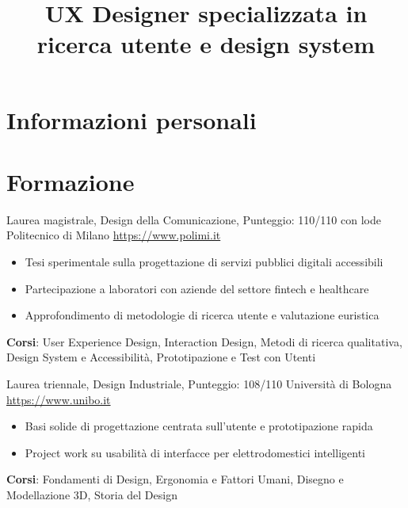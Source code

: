 \documentclass[a4paper, serif, 10pt]{moderncv}
\title{UX Designer specializzata in ricerca utente e design system}
\begin{document}
\maketitle

\section{Informazioni personali}

\section{Formazione}

        {Laurea magistrale, Design della Comunicazione, Punteggio: 110/110 con lode}
        {Politecnico di Milano}
        {\url{https://www.polimi.it}}
        {}
        {\begin{itemize}
\item Tesi sperimentale sulla progettazione di servizi pubblici digitali accessibili
\item Partecipazione a laboratori con aziende del settore fintech e healthcare
\item Approfondimento di metodologie di ricerca utente e valutazione euristica
\end{itemize}
\textbf{Corsi}: User Experience Design, Interaction Design, Metodi di ricerca qualitativa, Design System e Accessibilità, Prototipazione e Test con Utenti}

        {Laurea triennale, Design Industriale, Punteggio: 108/110}
        {Università di Bologna}
        {\url{https://www.unibo.it}}
        {}
        {\begin{itemize}
\item Basi solide di progettazione centrata sull'utente e prototipazione rapida
\item Project work su usabilità di interfacce per elettrodomestici intelligenti
\end{itemize}
\textbf{Corsi}: Fondamenti di Design, Ergonomia e Fattori Umani, Disegno e Modellazione 3D, Storia del Design}
\end{document}
